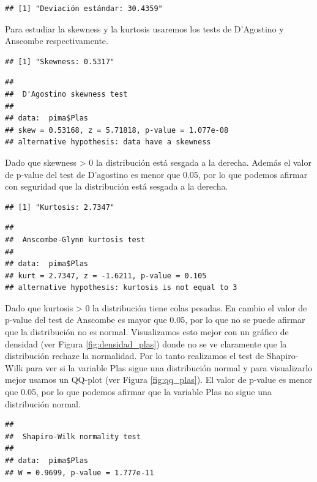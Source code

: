 \documentclass[
]{article}
\begin{document}
\begin{verbatim}
## [1] "Deviación estándar: 30.4359"
\end{verbatim}

Para estudiar la skewness y la kurtosis usaremos los tests de D'Agostino
y Anscombe respectivamente.

\begin{verbatim}
## [1] "Skewness: 0.5317"
\end{verbatim}

\begin{verbatim}
## 
##  D'Agostino skewness test
## 
## data:  pima$Plas
## skew = 0.53168, z = 5.71818, p-value = 1.077e-08
## alternative hypothesis: data have a skewness
\end{verbatim}

Dado que skewness \textgreater{} 0 la distribución está sesgada a la
derecha. Además el valor de p-value del test de D'agostino es menor que
0.05, por lo que podemos afirmar con seguridad que la distribución está
sesgada a la derecha.

\begin{verbatim}
## [1] "Kurtosis: 2.7347"
\end{verbatim}

\begin{verbatim}
## 
##  Anscombe-Glynn kurtosis test
## 
## data:  pima$Plas
## kurt = 2.7347, z = -1.6211, p-value = 0.105
## alternative hypothesis: kurtosis is not equal to 3
\end{verbatim}

Dado que kurtosis \textgreater{} 0 la distribución tiene colas pesadas.
En cambio el valor de p-value del test de Anscombe es mayor que 0.05,
por lo que no se puede afirmar que la distribución no es normal.
Visualizamos esto mejor con un gráfico de densidad (ver Figura
\ref{fig:densidad_plas}) donde no se ve claramente que la distribución
rechaze la normalidad. Por lo tanto realizamos el test de Shapiro-Wilk
para ver si la variable Plas sigue una distribución normal y para
visualizarlo mejor usamos un QQ-plot (ver Figura \ref{fig:qq_plas}). El
valor de p-value es menor que 0.05, por lo que podemos afirmar que la
variable Plas no sigue una distribución normal.

\begin{verbatim}
## 
##  Shapiro-Wilk normality test
## 
## data:  pima$Plas
## W = 0.9699, p-value = 1.777e-11
\end{verbatim}
\end{document}
